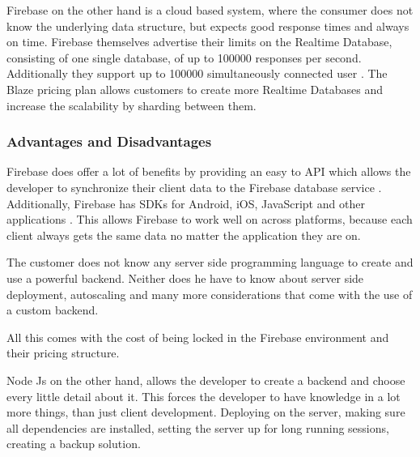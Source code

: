 Firebase on the other hand is a cloud based system, where the consumer does not know the underlying data structure, but expects good response times and always on time. Firebase themselves advertise their limits on the Realtime Database, consisting of one single database, of up to 100000 responses per second. Additionally they support up to 100000 simultaneously connected user \cite{FirebaseDoc}. The Blaze pricing plan allows customers to create more Realtime Databases and increase the scalability by sharding between them.

\subsubsection{Advantages and Disadvantages}

Firebase does offer a lot of benefits by providing an easy to API which allows the developer to synchronize their client data to the Firebase database service \cite{khawas2018application}. Additionally, Firebase has SDKs for Android, iOS, JavaScript and other applications \cite{FirebaseDoc}. This allows Firebase to work well on across platforms, because each client always gets the same data no matter the application they are on. 

The customer does not know any server side programming language to create and use a powerful backend. Neither does he have to know about server side deployment, autoscaling and many more considerations that come with the use of a custom backend.

All this comes with the cost of being locked in the Firebase environment and their pricing structure.

Node Js on the other hand, allows the developer to create a backend and choose every little detail about it. This forces the developer to have knowledge in a lot more things, than just client development. Deploying on the server, making sure all dependencies are installed, setting the server up for long running sessions, creating a backup solution.